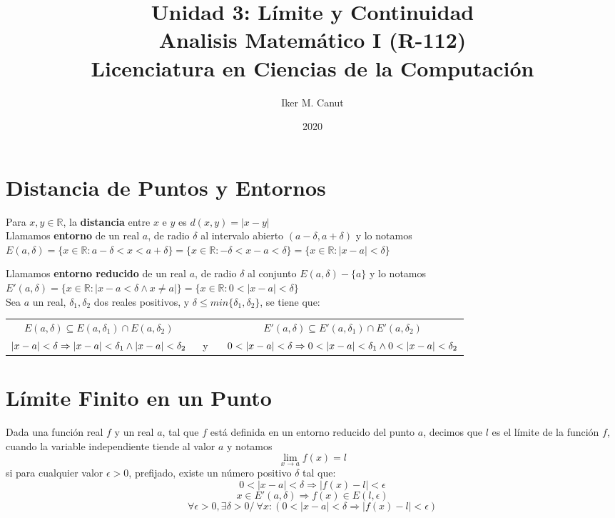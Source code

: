 \documentclass[11pt,a4paper]{article}
\author{Iker M. Canut}
\title{Unidad 3: L\'imite y Continuidad\\ Analisis Matem\'atico I (R-112)\\Licenciatura en Ciencias de la Computaci\'on}
\date{2020}
\begin{document}
\maketitle
\newpage

\section{Distancia de Puntos y Entornos}
\noindent Para $x,y \in \mathbb{R}$, la \textbf{distancia} entre $x$ e $y$ es $d(x,y) = |x-y|$\\

\noindent Llamamos \textbf{entorno} de un real $a$, de radio $\delta$ al intervalo abierto $(a-\delta, a+\delta)$ y lo notamos\\ $E(a,\delta) = \{x\in\mathbb{R}:a-\delta<x<a+\delta\} = \{x\in\mathbb{R}:-\delta<x-a<\delta\} = \{x\in\mathbb{R}:|x-a|<\delta\}$

\noindent Llamamos \textbf{entorno reducido} de un real $a$, de radio $\delta$ al conjunto $E(a,\delta) - \{a\}$ y lo notamos $E'(a,\delta) = \{x\in\mathbb{R}:|x-a<\delta\land x\not = a|\} = \{x\in\mathbb{R}:0<|x-a|<\delta\}$\\

\noindent Sea $a$ un real, $\delta_1, \delta_2$ dos reales positivos, y $\delta\leq min\{\delta_1, \delta_2\}$, se tiene que:
\begin{table}[h]
\centering
\begin{tabular}{ccc}
$E(a,\delta) \subseteq E(a,\delta_1) \cap E(a,\delta_2)$ & \ \ \ \ & $E'(a,\delta) \subseteq E'(a,\delta_1) \cap E'(a,\delta_2)$\\
$|x-a|<\delta \Rightarrow |x-a|<\delta_1 \land |x-a|<\delta_2 \hfill$ & \ y \ & $\hfill 0<|x-a|<\delta \Rightarrow 0<|x-a|<\delta_1 \land 0<|x-a|<\delta_2$
\end{tabular}
\end{table}

\section{L\'imite Finito en un Punto}
\noindent Dada una funci\'on real $f$ y un real $a$, tal que $f$ est\'a definida en un entorno reducido del punto $a$, decimos que $l$ es el l\'imite de la funci\'on $f$, cuando la variable independiente tiende al valor $a$ y notamos $$\lim_{x\to a}f(x)=l$$ si para cualquier valor $\epsilon > 0$, prefijado, existe un n\'umero positivo $\delta$ tal que: $$0<|x-a|<\delta \Rightarrow |f(x)-l| < \epsilon$$ $$x \in E'(a, \delta) \Rightarrow f(x) \in E(l, \epsilon)$$ $$\forall \epsilon > 0, \exists \delta > 0 /\ \forall x : (0 < |x-a| < \delta \Rightarrow |f(x)-l|<\epsilon)$$\\
\end{document}
